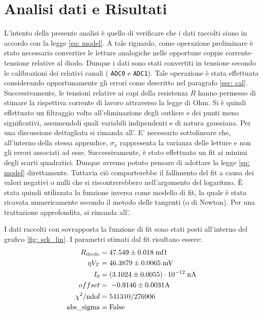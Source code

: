 \documentclass{article}[a4paper, oneside, 11pt]
\begin{document}
\section{Analisi dati e Risultati}
L’intento della presente analisi è quello di verificare che i dati raccolti 
siano in accordo con la legge \eqref{eq: model}. A tale riguardo, come 
operazione preliminare è stato necessario convertire le letture analogiche 
nelle opportune coppie corrente-tensione relative al diodo. Dunque i dati sono 
stati convertiti in tensione secondo le calibrazioni dei relativi canali (
\verb+ADC0+ e \verb+ADC1+). Tale operazione è stata effettuata considerando
opportunamente gli errori come descritto nel paragrafo \ref{sec: cal}.
Successivamente, le tensioni relative ai capi della resistenza $R$ hanno
permesso di stimare la rispettiva corrente di lavoro attraverso la legge di Ohm. 
Si è quindi effettuato un filtraggio volto all'eliminazione degli outliers e 
dei punti meno significativi, assumendoli quali variabili indipendenti e di 
natura gaussiana. Per una discussione dettagliata si rimanda all'. E’ necessario sottolineare che, all’interno della stessa appendice, 
$\sigma_x$ rappresenta la varianza delle letture e non gli errori associati ad 
esse.
Successivamente, è stato effettuato un fit ai minimi degli scarti quadratici. 
Dunque avremo potuto pensare di adottare la legge \eqref{eq: model} 
direttamente. Tuttavia ciò comporterebbe il fallimento del fit a causa dei 
valori negativi o nulli che si riscontrerebbero nell’argomento del logaritmo. 
\`E stata quindi utilizzata la funzione inversa come modello di fit, la quale 
è stata ricavata numericamente secondo il metodo delle tangenti (o di Newton). 
Per una trattazione approfondita, si rimanda all'.


I dati raccolti con sovrapposta la funzione di fit sono stati posti all'interno 
del grafico \ref{fig: sck_lin}.
I parametri stimati dal fit risultano essere:
\begin{align*}
	R_{\text{diodo}} &= 47.549 \pm 0.018 \; \rm m\Omega \\
	\eta V_T &= 46.3879 \pm 0.0065 \; \rm mV \\
	I_0 &= (3.1024 \pm 0.0055) \cdot 10^{-12} \; \rm nA \\
	offset &=\; - 0.9146\pm 0.0031\rm A\\
	\chi^2/\text{ndof} &= 541310/276906 \\
	\text{abs\_sigma} &= \rm False
\end{align*}
\end{document}
